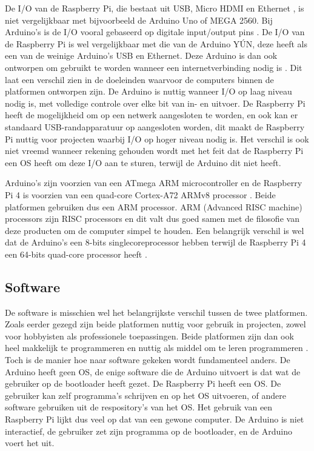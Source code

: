 \documentclass[a4paper, dutch, abstract=true]{scrartcl}
\begin{document}
De I/O van de Raspberry Pi, die bestaat uit USB, Micro HDMI en Ethernet \cite{raspberry20194bspecs},
is niet vergelijkbaar met bijvoorbeeld de Arduino Uno of MEGA 2560.
Bij Arduino's is de I/O vooral gebaseerd op digitale input/output pins
\cite{arduino2019mega,arduino2019uno}.
De I/O van de Raspberry Pi is wel vergelijkbaar met die van de Arduino Y{\'U}N, deze heeft als een
van de weinige Arduino's USB en Ethernet.
Deze Arduino is dan ook ontworpen om gebruikt te worden wanneer een internetverbinding nodig is
\cite{arduino2019yun}.
Dit laat een verschil zien in de doeleinden waarvoor de computers binnen de platformen ontworpen
zijn.
De Arduino is nuttig wanneer I/O op laag niveau nodig is, met volledige controle over elke bit van
in- en uitvoer.
De Raspberry Pi heeft de mogelijkheid om op een netwerk aangesloten te worden, en ook kan er
standaard USB-randapparatuur op aangesloten worden, dit maakt de Raspberry Pi nuttig voor projecten
waarbij I/O op hoger niveau nodig is.
Het verschil is ook niet vreemd wanneer rekening gehouden wordt met het feit dat de Raspberry Pi een
OS heeft om deze I/O aan te sturen, terwijl de Arduino dit niet heeft.

Arduino's zijn voorzien van een ATmega ARM microcontroller
\cite{arduino2019mega,arduino2019uno,arduino2019yun,arduino2019leonardo,kumar2015arduino} en de
Raspberry Pi 4 is voorzien van een quad-core Cortex-A72 ARMv8 processor \cite{raspberry2019brief}.
Beide platformen gebruiken dus een ARM processor.
ARM (Advanced RISC machine) processors zijn RISC processors en dit valt dus goed samen met de
filosofie van deze producten om de computer simpel te houden.
Een belangrijk verschil is wel dat de Arduino's een 8-bits singlecoreprocessor hebben terwijl de
Raspberry Pi 4 een 64-bits quad-core processor heeft \cite{raspberry2019brief}.

\subsection{Software}
De software is misschien wel het belangrijkste verschil tussen de twee platformen.
Zoals eerder gezegd zijn beide platformen nuttig voor gebruik in projecten, zowel voor hobbyisten
als professionele toepassingen.
Beide platformen zijn dan ook heel makkelijk te programmeren en nuttig als middel om te leren
programmeren \cite{raspberry2015what,jamieson2011arduino,rubio2013using}.
Toch is de manier hoe naar software gekeken wordt fundamenteel anders.
De Arduino heeft geen OS, de enige software die de Arduino uitvoert is dat wat de gebruiker op de
bootloader heeft gezet.
De Raspberry Pi heeft een OS.
De gebruiker kan zelf programma's schrijven en op het OS uitvoeren, of andere software gebruiken
uit de respository's van het OS.
Het gebruik van een Raspberry Pi lijkt dus veel op dat van een gewone computer.
De Arduino is niet interactief, de gebruiker zet zijn programma op de bootloader, en de Arduino
voert het uit.
\end{document}
